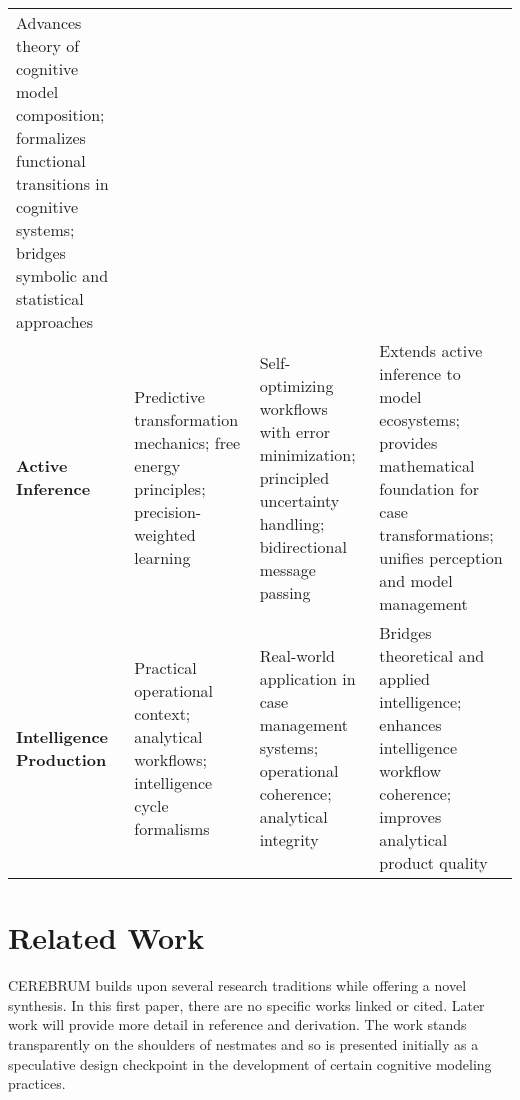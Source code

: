 \begin{longtable}[]{@{}llll@{}}
\begin{minipage}[t]{0.33\columnwidth}
Advances theory of cognitive model composition; formalizes functional
transitions in cognitive systems; bridges symbolic and statistical
approaches\strut
\end{minipage}\tabularnewline
\begin{minipage}[t]{0.10\columnwidth}\raggedright
\textbf{Active Inference}\strut
\end{minipage} & \begin{minipage}[t]{0.18\columnwidth}\raggedright
Predictive transformation mechanics; free energy principles;
precision-weighted learning\strut
\end{minipage} & \begin{minipage}[t]{0.27\columnwidth}\raggedright
Self-optimizing workflows with error minimization; principled
uncertainty handling; bidirectional message passing\strut
\end{minipage} & \begin{minipage}[t]{0.33\columnwidth}\raggedright
Extends active inference to model ecosystems; provides mathematical
foundation for case transformations; unifies perception and model
management\strut
\end{minipage}\tabularnewline
\begin{minipage}[t]{0.10\columnwidth}\raggedright
\textbf{Intelligence Production}\strut
\end{minipage} & \begin{minipage}[t]{0.18\columnwidth}\raggedright
Practical operational context; analytical workflows; intelligence cycle
formalisms\strut
\end{minipage} & \begin{minipage}[t]{0.27\columnwidth}\raggedright
Real-world application in case management systems; operational
coherence; analytical integrity\strut
\end{minipage} & \begin{minipage}[t]{0.33\columnwidth}\raggedright
Bridges theoretical and applied intelligence; enhances intelligence
workflow coherence; improves analytical product quality\strut
\end{minipage}\tabularnewline
\bottomrule
\end{longtable}

\hypertarget{related-work}{%
\section{Related Work}\label{related-work}}

CEREBRUM builds upon several research traditions while offering a novel
synthesis. In this first paper, there are no specific works linked or
cited. Later work will provide more detail in reference and derivation.
The work stands transparently on the shoulders of nestmates and so is
presented initially as a speculative design checkpoint in the
development of certain cognitive modeling practices.

